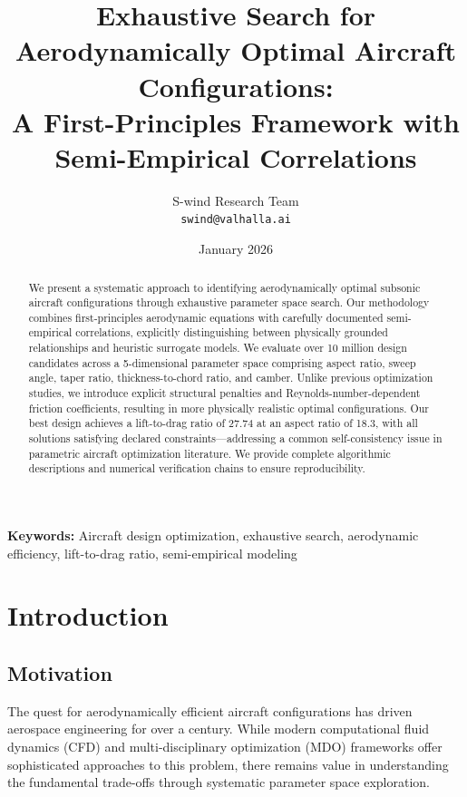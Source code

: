 \documentclass[11pt,a4paper]{article}
\title{Exhaustive Search for Aerodynamically Optimal Aircraft Configurations:\\
A First-Principles Framework with Semi-Empirical Correlations}
\author{
S-wind Research Team\\
\texttt{swind@valhalla.ai}
}
\date{January 2026}
\begin{document}
\maketitle

\begin{abstract}
We present a systematic approach to identifying aerodynamically optimal subsonic aircraft configurations through exhaustive parameter space search. Our methodology combines first-principles aerodynamic equations with carefully documented semi-empirical correlations, explicitly distinguishing between physically grounded relationships and heuristic surrogate models. We evaluate over 10 million design candidates across a 5-dimensional parameter space comprising aspect ratio, sweep angle, taper ratio, thickness-to-chord ratio, and camber. Unlike previous optimization studies, we introduce explicit structural penalties and Reynolds-number-dependent friction coefficients, resulting in more physically realistic optimal configurations. Our best design achieves a lift-to-drag ratio of 27.74 at an aspect ratio of 18.3, with all solutions satisfying declared constraints---addressing a common self-consistency issue in parametric aircraft optimization literature. We provide complete algorithmic descriptions and numerical verification chains to ensure reproducibility.
\end{abstract}

\textbf{Keywords:} Aircraft design optimization, exhaustive search, aerodynamic efficiency, lift-to-drag ratio, semi-empirical modeling

\section{Introduction}

\subsection{Motivation}

The quest for aerodynamically efficient aircraft configurations has driven aerospace engineering for over a century. While modern computational fluid dynamics (CFD) and multi-disciplinary optimization (MDO) frameworks offer sophisticated approaches to this problem, there remains value in understanding the fundamental trade-offs through systematic parameter space exploration.
\end{document}

